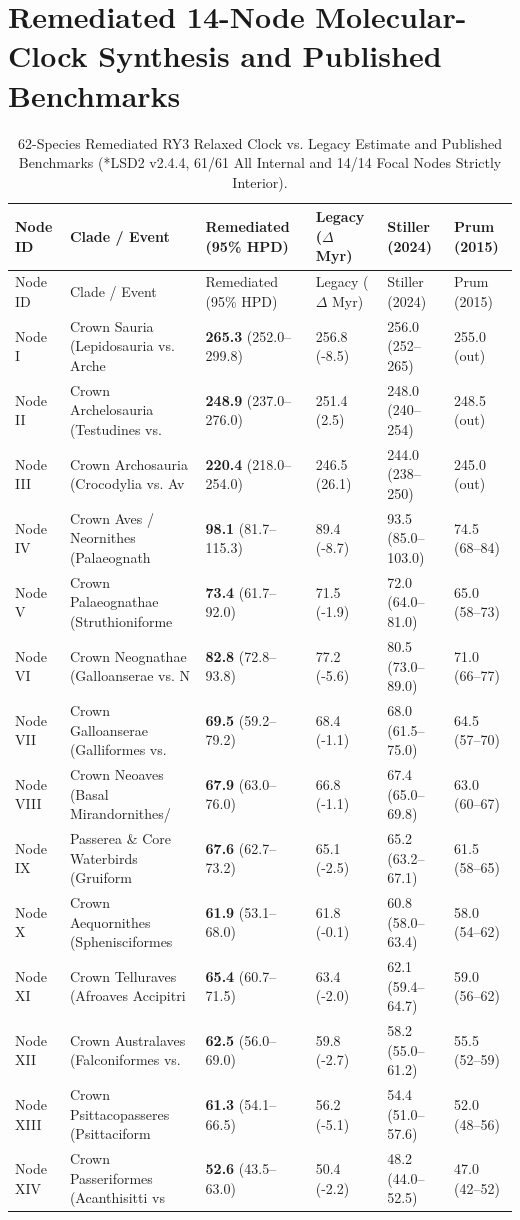 \documentclass[10pt,letterpaper]{article}
\begin{document}
\section{Remediated 14-Node Molecular-Clock Synthesis and Published Benchmarks}
\begin{longtable}{llllll}
\caption{62-Species Remediated RY3 Relaxed Clock vs. Legacy Estimate and Published Benchmarks (*LSD2 v2.4.4, 61/61 All Internal and 14/14 Focal Nodes Strictly Interior).} \\
\toprule
Node ID & Clade / Event & Remediated (95\% HPD) & Legacy ($\Delta$ Myr) & Stiller (2024) & Prum (2015) \\
\midrule
\endfirsthead
\toprule
Node ID & Clade / Event & Remediated (95\% HPD) & Legacy ($\Delta$ Myr) & Stiller (2024) & Prum (2015) \\
\midrule
\endhead
Node I & Crown Sauria (Lepidosauria vs. Arche & \textbf{265.3} (252.0--299.8) & 256.8 (-8.5) & 256.0 (252--265) & 255.0 (out) \\
Node II & Crown Archelosauria (Testudines vs.  & \textbf{248.9} (237.0--276.0) & 251.4 (2.5) & 248.0 (240--254) & 248.5 (out) \\
Node III & Crown Archosauria (Crocodylia vs. Av & \textbf{220.4} (218.0--254.0) & 246.5 (26.1) & 244.0 (238--250) & 245.0 (out) \\
Node IV & Crown Aves / Neornithes (Palaeognath & \textbf{98.1} (81.7--115.3) & 89.4 (-8.7) & 93.5 (85.0--103.0) & 74.5 (68--84) \\
Node V & Crown Palaeognathae (Struthioniforme & \textbf{73.4} (61.7--92.0) & 71.5 (-1.9) & 72.0 (64.0--81.0) & 65.0 (58--73) \\
Node VI & Crown Neognathae (Galloanserae vs. N & \textbf{82.8} (72.8--93.8) & 77.2 (-5.6) & 80.5 (73.0--89.0) & 71.0 (66--77) \\
Node VII & Crown Galloanserae (Galliformes vs.  & \textbf{69.5} (59.2--79.2) & 68.4 (-1.1) & 68.0 (61.5--75.0) & 64.5 (57--70) \\
Node VIII & Crown Neoaves (Basal Mirandornithes/ & \textbf{67.9} (63.0--76.0) & 66.8 (-1.1) & 67.4 (65.0--69.8) & 63.0 (60--67) \\
Node IX & Passerea \& Core Waterbirds (Gruiform & \textbf{67.6} (62.7--73.2) & 65.1 (-2.5) & 65.2 (63.2--67.1) & 61.5 (58--65) \\
Node X & Crown Aequornithes (Sphenisciformes  & \textbf{61.9} (53.1--68.0) & 61.8 (-0.1) & 60.8 (58.0--63.4) & 58.0 (54--62) \\
Node XI & Crown Telluraves (Afroaves Accipitri & \textbf{65.4} (60.7--71.5) & 63.4 (-2.0) & 62.1 (59.4--64.7) & 59.0 (56--62) \\
Node XII & Crown Australaves (Falconiformes vs. & \textbf{62.5} (56.0--69.0) & 59.8 (-2.7) & 58.2 (55.0--61.2) & 55.5 (52--59) \\
Node XIII & Crown Psittacopasseres (Psittaciform & \textbf{61.3} (54.1--66.5) & 56.2 (-5.1) & 54.4 (51.0--57.6) & 52.0 (48--56) \\
Node XIV & Crown Passeriformes (Acanthisitti vs & \textbf{52.6} (43.5--63.0) & 50.4 (-2.2) & 48.2 (44.0--52.5) & 47.0 (42--52) \\
\bottomrule
\end{longtable}
\end{document}
